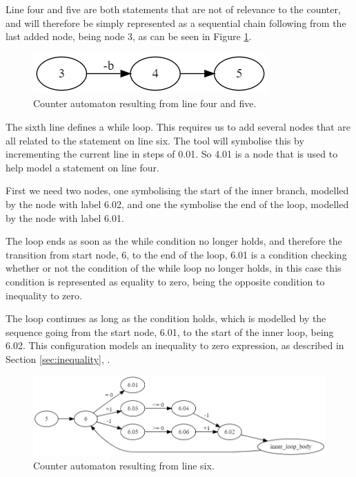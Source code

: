 \documentclass[12pt]{article}
\begin{document}
Line four and five are both statements that are not of relevance to the counter, and will therefore be simply represented as a sequential chain following from the last added node, being node 3, as can be seen in Figure \ref{fig:final_overview_5}.

\begin{figure}[h]
	\centering
	\includegraphics[width=0.5\linewidth]{final_overview_5}
	\caption{Counter automaton resulting from line four and five.}
	\label{fig:final_overview_5}
\end{figure}

The sixth line defines a while loop. This requires us to add several nodes that are all related to the statement on line six. The tool will symbolise this by incrementing the current line in steps of 0.01. So 4.01 is a node that is used to help model a statement on line four.

First we need two nodes, one symbolising the start of the inner branch, modelled by the node with label 6.02, and one the symbolise the end of the loop, modelled by the node with label 6.01.

The loop ends as soon as the while condition no longer holds, and therefore the transition from start node, 6, to the end of the loop, 6.01 is a condition checking whether or not the condition of the while loop no longer holds, in this case this condition is represented as equality to zero, being the opposite condition to inequality to zero. 

The loop continues as long as the condition holds, which is modelled by the sequence going from the start node, 6.01, to the start of the inner loop, being 6.02. This configuration models an inequality to zero expression, as described in Section \ref{sec:inequality}, .

\begin{figure}[h]
	\centering
	\includegraphics[width=\linewidth]{final_overview_6}
	\caption{Counter automaton resulting from line six.}
	\label{fig:final_overview_6}
\end{figure}
\end{document}
